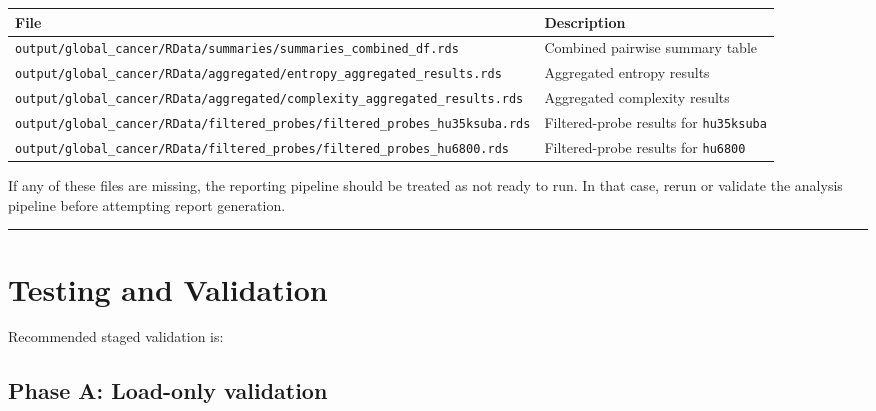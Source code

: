 \documentclass[
  letterpaper,
  DIV=11,
  numbers=noendperiod,
  openany,
  oneside]{scrreprt}
\begin{document}
\begin{longtable}[]{@{}
  >{\raggedright\arraybackslash}p{}
  >{\raggedright\arraybackslash}p{}@{}}
\toprule\noalign{}
\begin{minipage}[b]{\linewidth}\raggedright
File
\end{minipage} & \begin{minipage}[b]{\linewidth}\raggedright
Description
\end{minipage} \\
\midrule\noalign{}
\endhead
\bottomrule\noalign{}
\endlastfoot
\texttt{output/global\_cancer/RData/summaries/summaries\_combined\_df.rds}
& Combined pairwise summary table \\
\texttt{output/global\_cancer/RData/aggregated/entropy\_aggregated\_results.rds}
& Aggregated entropy results \\
\texttt{output/global\_cancer/RData/aggregated/complexity\_aggregated\_results.rds}
& Aggregated complexity results \\
\texttt{output/global\_cancer/RData/filtered\_probes/filtered\_probes\_hu35ksuba.rds}
& Filtered-probe results for \texttt{hu35ksuba} \\
\texttt{output/global\_cancer/RData/filtered\_probes/filtered\_probes\_hu6800.rds}
& Filtered-probe results for \texttt{hu6800} \\
\end{longtable}

If any of these files are missing, the reporting pipeline should be
treated as not ready to run. In that case, rerun or validate the
analysis pipeline before attempting report generation.

\begin{center}\rule{0.5\linewidth}{0.5pt}\end{center}

\section*{Testing and Validation}\label{testing-and-validation-2}


Recommended staged validation is:

\subsection*{Phase A: Load-only
validation}\label{phase-a-load-only-validation}
\end{document}
